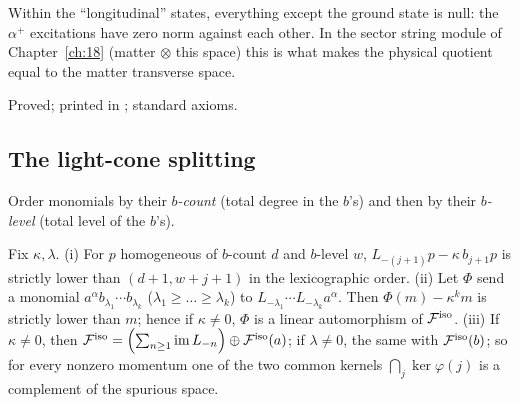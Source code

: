 \begin{physics}
Within the ``longitudinal'' states, everything except the ground state is null: the $\alpha^+$ excitations have zero
norm against each other.  In the sector string module of Chapter~\ref{ch:18} (matter $\otimes$ this space) this is what
makes the physical quotient equal to the matter transverse space.
\end{physics}

\begin{status}
Proved; printed in ; standard axioms.
\end{status}

\subsection{The light-cone splitting}

Order monomials by their \emph{$b$-count} (total degree in the $b$'s) and then by their \emph{$b$-level} (total
level of the $b$'s).

\begin{theorem}\label{ch17:thm:hyppbw}\label{ch17:thm:hyplightcone}
Fix $\kappa,\lambda$.  (i) For $p$ homogeneous of $b$-count $d$ and $b$-level $w$,
$L_{-(j+1)}p-\kappa\,b_{j+1}p$ is strictly lower than $(d+1,w+j+1)$ in the lexicographic order.
(ii) Let $\Phi$ send a monomial $a^\alpha b_{\lambda_1}\cdots b_{\lambda_k}$ ($\lambda_1\ge\dots\ge\lambda_k$) to
$L_{-\lambda_1}\cdots L_{-\lambda_k}a^\alpha$.  Then $\Phi(m)-\kappa^km$ is strictly lower than $m$; hence if $\kappa\ne0$,
$\Phi$ is a linear automorphism of $\mathcal{F}^{\mathrm{iso}}$.
(iii) If $\kappa\ne0$, then $\mathcal{F}^{\mathrm{iso}}=\Bigl(\sum_{n\ge1}\operatorname{im}L_{-n}\Bigr)\oplus\mathcal{F}^{\mathrm{iso}}(a)$; if $\lambda\ne0$,
the same with $\mathcal{F}^{\mathrm{iso}}(b)$; so for every nonzero momentum one of the two common kernels
$\bigcap_j\ker \varphi(j)$ is a complement of the spurious space.
\end{theorem}

